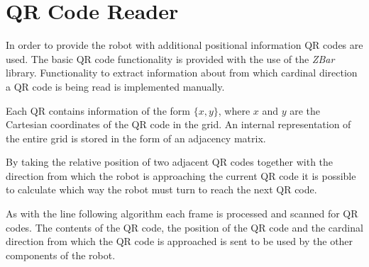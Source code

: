 \section*{QR Code Reader}
In order to provide the robot with additional positional information QR codes are used.
The basic QR code functionality is provided with the use of the \emph{ZBar}\cite{zbar} library.
Functionality to extract information about from which cardinal direction a QR code is being read is implemented manually.

Each QR contains information of the form $\{x,y\}$, where $x$ and $y$ are the Cartesian coordinates of the QR code in the grid.
An internal representation of the entire grid is stored in the form of an adjacency matrix.

By taking the relative position of two adjacent QR codes together with the direction from which the robot is approaching the current QR code it is possible to calculate which way the robot must turn to reach the next QR code.

As with the line following algorithm each frame is processed and scanned for QR codes.
The contents of the QR code, the position of the QR code and the cardinal direction from which the QR code is approached is sent to be used by the other components of the robot.